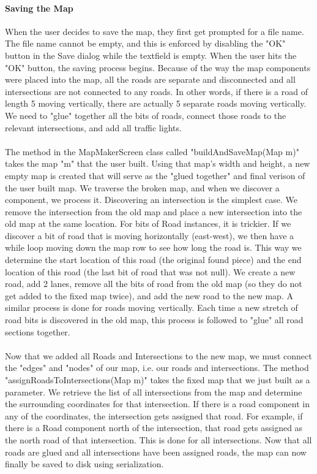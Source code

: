 \documentclass[a4paper,11pt,titlepage]{article}
\begin{document}
\paragraph{Saving the Map}
When the user decides to save the map, they first get prompted for a file name. The file name cannot be empty, and this is enforced by disabling the "OK" button in the Save dialog while the textfield is empty. When the user hits the "OK" button, the saving process begins. Because of the way the map components were placed into the map, all the roads are separate and disconnected and all intersections are not connected to any roads. In other words, if there is a road of length 5 moving vertically, there are actually 5 separate roads moving vertically. We need to "glue" together all the bits of roads, connect those roads to the relevant intersections, and add all traffic lights. 
\paragraph{}
The method in the MapMakerScreen class called "buildAndSaveMap(Map m)" takes the map "m" that the user built. Using that map's width and height, a new empty map is created that will serve as the "glued together" and final verison of the user built map. We traverse the broken map, and when we discover a component, we process it. Discovering an intersection is the simplest case. We remove the intersection from the old map and place a new intersection into the old map at the same location. For bits of Road instances, it is trickier. If we discover a bit of road that is moving horizontally (east-west), we then have a while loop moving down the map row to see how long the road is. This way we determine the start location of this road (the original found piece) and the end location of this road (the last bit of road that was not null). We create a new road, add 2 lanes, remove all the bits of road from the old map (so they do not get added to the fixed map twice), and add the new road to the new map. A similar process is done for roads moving vertically. Each time a new stretch of road bits is discovered in the old map, this process is followed to "glue" all road sections together.
\paragraph{}
Now that we added all Roads and Intersections to the new map, we must connect the "edges" and "nodes" of our map, i.e. our roads and intersections. The method "assignRoadsToIntersections(Map m)" takes the fixed map that we just built as a parameter. We retrieve the list of all intersections from the map and determine the surrounding coordinates for that intersection. If there is a road component in any of the coordinates, the intersection gets assigned that road. For example, if there is a Road component north of the intersection, that road gets assigned as the north road of that intersection. This is done for all intersections. Now that all roads are glued and all intersections have been assigned roads, the map can now finally be saved to disk using serialization.
\end{document}
